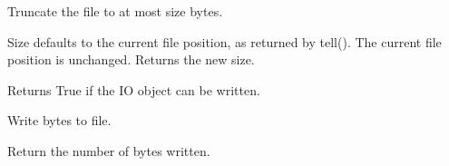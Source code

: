 \documentclass[letterpaper,10pt,english]{sphinxmanual}
\begin{document}
\begin{fulllineitems}
\begin{fulllineitems}
\label{\detokenize{modules/src.pig_sorting_streamlit.app:src.pig_sorting_streamlit.app.BytesIO.truncate}}
\pysigstartsignatures
\pysiglinewithargsret
{}
{\sphinxparamcomma {}}
{}
\pysigstopsignatures
\sphinxAtStartPar
Truncate the file to at most size bytes.

\sphinxAtStartPar
Size defaults to the current file position, as returned by tell().
The current file position is unchanged.  Returns the new size.

\end{fulllineitems}


\begin{fulllineitems}
\label{\detokenize{modules/src.pig_sorting_streamlit.app:src.pig_sorting_streamlit.app.BytesIO.writable}}
\pysigstartsignatures
\pysiglinewithargsret
{}
{}
{}
\pysigstopsignatures
\sphinxAtStartPar
Returns True if the IO object can be written.

\end{fulllineitems}


\begin{fulllineitems}
\label{\detokenize{modules/src.pig_sorting_streamlit.app:src.pig_sorting_streamlit.app.BytesIO.write}}
\pysigstartsignatures
\pysiglinewithargsret
{}
{\sphinxparamcomma {}}
{}
\pysigstopsignatures
\sphinxAtStartPar
Write bytes to file.

\sphinxAtStartPar
Return the number of bytes written.

\end{fulllineitems}



\end{fulllineitems}
\end{document}

